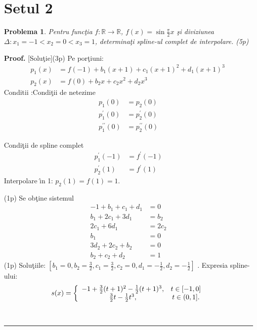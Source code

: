 \documentclass{article}%
\newtheorem{problem}[theorem]{Problema}
\newenvironment{proof}[1][Proof]{\noindent\textbf{#1.} }{\ \rule{0.5em}{0.5em}}
\begin{document}
\section*{Setul 2}

\begin{problem}
Pentru func\c{t}ia $f:\mathbb{R\rightarrow R}$, $f(x)=\sin\frac{\pi}{2}x$
\c{s}i diviziunea $\Delta:x_{1}=-1<x_{2}=0<x_{3}=1$, determina\c{t}i spline-ul
complet de interpolare. (5p)
\end{problem}

\begin{proof}
[Solu\c{t}ie](3p) Pe por\c{t}iuni:
\begin{align*}
p_{1}(x)  &  =f(-1)+b_{1}(x+1)+c_{1}(x+1)^{2}+d_{1}(x+1)^{3}~\\
p_{2}(x)  &  =f(0)+b_{2}x+c_{2}x^{2}+d_{2}x^{3}%
\end{align*}
Conditii :Condi\c{t}ii de netezime%
\begin{align*}
p_{1}(0)  &  =p_{2}(0)\\
p_{1}^{\prime}(0)  &  =p_{2}^{\prime}(0)\\
p_{1}^{\prime\prime}(0)  &  =p_{2}^{\prime\prime}(0)
\end{align*}


Condi\c{t}ii de spline complet%
\begin{align*}
p_{1}^{\prime}(-1)  &  =f^{\prime}(-1)\\
p_{2}^{\prime}(1)  &  =f^{\prime}(1)
\end{align*}
Interpolare \^{\i}n 1: $p_{2}(1)=f(1)=1$. 

(1p) Se ob\c{t}ine sistemul%
\begin{align*}
-1+b_{1}+c_{1}+d_{1}  &  =0\\
b_{1}+2c_{1}+3d_{1}  &  =b_{2}\\
2c_{1}+6d_{1}  &  =2c_{2}\\
b_{1}  &  =0\\
3d_{2}+2c_{2}+b_{2}  &  =0\\
b_{2}+c_{2}+d_{2}  &  =1
\end{align*}
(1p) Solu\c{t}iile: $\left[  b_{1}=0,b_{2}=\frac{3}{2}%
,c_{1}=\frac{3}{2},c_{2}=0,d_{1}=-\frac{1}{2},d_{2}=-\frac{1}{2}\right]
\allowbreak$ . Expresia spline-ului:%
\[
s(x)=\left\{
\begin{array}
[c]{cc}%
-1+\frac{3}{2}(t+1)^{2}-\frac{1}{2}(t+1)^{3}, & t\in\lbrack-1,0]\\
\frac{3}{2}t-\frac{1}{2}t^{3}, & t\in(0,1].
\end{array}
\right.
\]

\end{proof}
\end{document}

